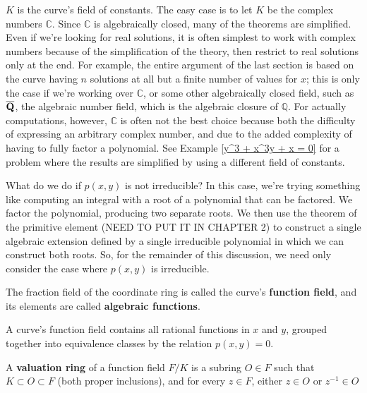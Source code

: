 $K$ is the curve's field of constants.  The easy case is to let $K$ be the complex numbers $\mathbb{C}$.
Since $\mathbb{C}$ is algebraically closed, many of the theorems are simplified.
Even if we're looking for real solutions, it is often simplest to work with complex
numbers because of the simplification of the theory, then restrict to real solutions
only at the end.  For example, the entire argument of the last section is based
on the curve having $n$ solutions at all but a finite number of values for $x$;
this is only the case if we're working over $\mathbb{C}$, or some other algebraically
closed field, such as $\mathbb{\overline{\mathbf{Q}}}$, the algebraic number field, which is
the algebraic closure of $\mathbb{Q}$.  For actually computations, however,
$\mathbb{C}$ is often not the best choice because both the difficulty of
expressing an arbitrary complex number, and due to the added complexity
of having to fully factor a polynomial.  See Example \ref{y^3 + x^3y + x = 0}
for a problem where the results are simplified by using a different field of constants.

What do we do if $p(x,y)$ is not irreducible?  In this case, we're trying something
like computing an integral with a root of a polynomial that can be factored.  We factor the
polynomial, producing two separate roots.  We then use the theorem of the
primitive element (NEED TO PUT IT IN CHAPTER 2) to construct a single algebraic
extension defined by a single irreducible polynomial in which we can construct
both roots.  So, for the remainder of this discussion, we need only consider the case
where $p(x,y)$ is irreducible.

\begin{definition}
The fraction field of the coordinate ring is called the curve's {\bf function field},
and its elements are called {\bf algebraic functions}.
\end{definition}

A curve's function field contains all rational functions in $x$ and $y$, grouped together into equivalence
classes by the relation $p(x,y)=0$.

\begin{definition}
A {\bf valuation ring} of a function field $F/K$ is a subring $O \in F$ such that
   $K \subset O \subset F$ (both proper inclusions), and
   for every $z \in F$, either $z \in O$ or $z^{-1} \in O$
\end{definition}

